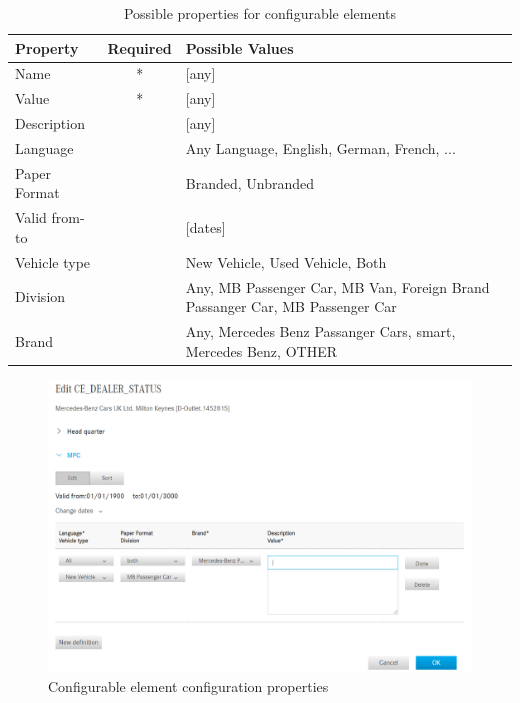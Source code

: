 \begin{table}[h!]
  \begin{center}
    \begin{tabular}{|l|c|p{10cm}|}
      \hline
      Property & Required & Possible Values \\
      \hline\hline
      Name & * & [any] \\
      \hline
      Value & * & [any] \\
      \hline
      Description & & [any] \\
      \hline
      Language & & Any Language, English, German, French, ... \\
      \hline
      Paper Format & & Branded, Unbranded \\
      \hline
      Valid from-to & & [dates] \\
      \hline
      Vehicle type & & New Vehicle, Used Vehicle, Both \\
      \hline
      Division & & Any, MB Passenger Car, MB Van, Foreign Brand Passanger Car, MB Passenger Car \\
      \hline
      Brand & & Any, Mercedes Benz Passanger Cars, smart, Mercedes Benz, OTHER \\
      \hline
    \end{tabular}
  \end{center}
  \caption{Possible properties for configurable elements}
  \label{table:ce-properties}
\end{table}

\begin{figure}
  \centering
  \includegraphics[width=0.8\linewidth]{assets/pos-ce-config-4.png}
  \caption{Configurable element configuration properties}
  \label{fig:ce-properties}
\end{figure}

